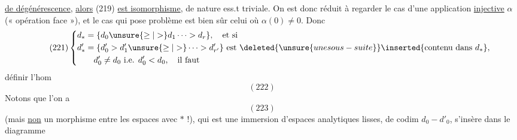 \uline{de dégénérescence}, \uline{alors} (219) \uline{est }
\uline{isomorphisme}, de nature ess.t triviale.
On est donc réduit à regarder le
cas d'une application \uline{injective} $\alpha$ (« opération
face »), et le  cas qui  pose problème
est bien sûr celui où $\alpha(0)\ne0$. Donc
\[
\tag{221}
\left\{\begin{aligned}
d_*&=\{d_0\unsure{\geq|>}d_1\cdots>d_r\},\quad\text{et si}\\
d'_*&=\{d'_0>d'_1\unsure{\geq|>}\cdots>d'_{r'}\}\text{ est }
\deleted{\unsure{une sous-suite}}\inserted{\text{contenu dans }d_*},\\
&\quad d'_0\ne d_0\text{ i.e. }d'_0<d_0,\quad\text{il faut}
\end{aligned}\right.
\]
définir l'hom
\[
(222)
\]
Notons que l'on a
\[
(223)
\]
(mais \uline{non} un morphisme entre les
espaces avec $*$ !), qui est une immersion 
d'espaces analytiques lisses, de codim
$d_0-d'_0$,  s'insère dans le diagramme
